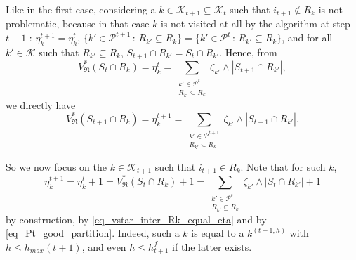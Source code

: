 \documentclass[
  11pt,
  a4paper,
]{article}
\theoremstyle{definition}
\theoremstyle{plain}
\theoremstyle{plain}
\theoremstyle{plain}
\theoremstyle{definition}
\theoremstyle{remark}
\begin{document}
Like in the first case, considering a
\(k\in\mathcal{K}_{t+1}\subseteq \mathcal{K}_t\) such that
\(i_{t+1}\not\in R_k\) is not problematic, because in that case \(k\) is
not visited at all by the algorithm at step \(t+1\) :
\(\eta^{t+1}_k=\eta^{t}_k\),
\(\{k'\in\mathcal{P}^{t+1}\,:\,R_{k'}\subseteq R_k\}=\{k'\in\mathcal{P}^{t}\,:\,R_{k'}\subseteq R_k\}\),
and for all \(k'\in \mathcal{K}\) such that \(R_{k'}\subseteq R_k\),
\(S_{t+1}\cap R_{k'}=S_{t}\cap R_{k'}\). Hence, from \begin{equation*}
V^*_{\mathfrak{R}}(S_{t}\cap R_k) =  \eta_k^{t} =  \sum_{\substack{k'\in\mathcal{P}^{t}\\R_{k'}\subseteq R_k}} \zeta_{k'}\wedge |S_{t+1}\cap R_{k'}| ,
\end{equation*} we directly have \begin{equation*}
V^*_{\mathfrak{R}}(S_{t+1}\cap R_k) =  \eta_k^{t+1} =  \sum_{\substack{k'\in\mathcal{P}^{t+1}\\R_{k'}\subseteq R_k}} \zeta_{k'}\wedge |S_{t+1}\cap R_{k'}| .
\end{equation*}

So we now focus on the \(k\in\mathcal{K}_{t+1}\) such that
\(i_{t+1}\in R_k\). Note that for such \(k\), \begin{equation*}
\eta^{t+1}_k=\eta^t_k+1=V^*_{\mathfrak{R}}(S_t\cap R_k)+1=\sum_{\substack{k'\in \mathcal{P}^t\\ R_{k'}\subseteq R_k}}\zeta_{k'}\wedge|S_t\cap R_{k'}|+1
\end{equation*} by construction, by \eqref{eq_vstar_inter_Rk_equal_eta}
and by \eqref{eq_Pt_good_partition}. Indeed, such a \(k\) is equal to a
\(k^{(t+1,h)}\) with \(h\leq h_{max}(t+1)\), and even
\(h\leq h^f_{t+1}\) if the latter exists.
\end{document}
